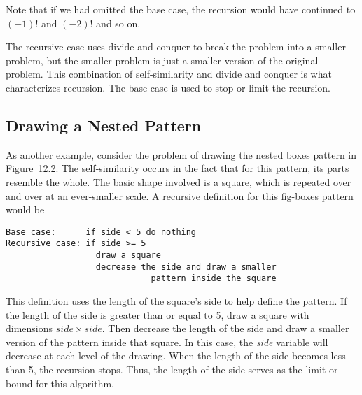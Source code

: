 \noindent   Note
that if we had omitted the base case, the recursion would have
continued to $(-1)$! and $(-2)$! and so on.



\noindent The recursive case uses
divide and conquer to break the problem into a smaller problem, but
the smaller problem is just a smaller version of the original
problem.  This combination of self-similarity and divide and conquer is
what characterizes recursion.  The base
case is used to stop or limit the recursion.



\subsection{Drawing a Nested Pattern}
\noindent As another example, consider the problem of drawing the nested boxes
pattern in Figure~12.2. The self-similarity occurs in the
fact that for this pattern, its parts resemble the
whole.  The basic shape involved is a square, which is repeated over
and over at an ever-smaller scale.  A recursive definition for this
{fig-boxes}
pattern would be

\begin{jjjlisting}
\begin{lstlisting}
Base case:      if side < 5 do nothing
Recursive case: if side >= 5
                  draw a square
                  decrease the side and draw a smaller 
                             pattern inside the square
\end{lstlisting}
\end{jjjlisting}

\noindent This definition uses the length of the square's side
to help define the pattern.  If the length of the side is greater than or
equal to 5, draw a square with dimensions $side \times side$. Then
decrease the length of the side and draw a smaller version of the
pattern inside that square.  In this case, the {\it side} variable will
decrease at each level of the drawing.  When the length of the side
becomes less than 5, the recursion stops.  Thus, the length of the side
serves as the limit or bound for this algorithm.

